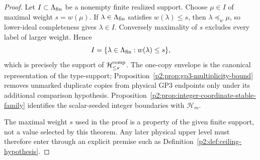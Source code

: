 \documentclass[11pt,a4paper]{article}
\begin{document}
\begin{proof}
Let \(I\subset\Lambda_{\rm fin}\) be a nonempty finite realized support.
Choose \(\mu\in I\) of maximal weight \(s=w(\mu)\).  If
\(\lambda\in\Lambda_{\rm fin}\) satisfies \(w(\lambda)\le s\), then
\(\lambda\preceq_w\mu\), so lower-ideal completeness gives
\(\lambda\in I\).  Conversely maximality of \(s\) excludes every label of
larger weight.  Hence
\[
 I=\{\lambda\in\Lambda_{\rm fin}:w(\lambda)\le s\},
\]
which is precisely the support of
\(\mathcal H_{\le s}^{\rm comp}\).
The one-copy envelope is the canonical representation of the type-support;
Proposition~\ref{p2:prop:gp3-multiplicity-bound} removes unmarked duplicate
copies from physical GP3 endpoints only under its additional comparison
hypothesis.  Proposition~\ref{p2:prop:integer-coordinate-stable-family}
identifies the scalar-seeded integer boundaries with \(\mathcal H_m\).

The maximal weight \(s\) used in the proof is a property of the given finite
support, not a value selected by this theorem.  Any later physical upper level
must therefore enter through an explicit premise such as
Definition~\ref{p2:def:ceiling-hypothesis}.
\end{proof}
\end{document}
